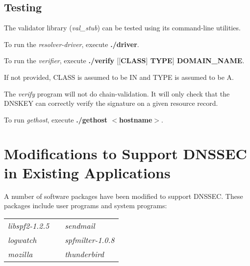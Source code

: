 \documentclass[12pt]{article}
\newcommand{\cmd}[1]{{\em #1}}
\newcommand{\lib}[1]{{\em #1}}
\newcommand{\xqt}[1]{{\bf #1}}
\begin{document}

\subsection{Testing}

The validator library (\lib{val\_stub}) can be tested using its command-line
utilities.

To run the \cmd{resolver-driver}, execute \xqt{./driver}.

To run the \cmd{verifier}, execute \xqt{./verify $[[$CLASS$]$ TYPE$]$ DOMAIN\_NAME}.

If not provided, CLASS is assumed to be IN and TYPE is assumed to be A.

The \cmd{verify} program will not do chain-validation.  It will only check
that the DNSKEY can correctly verify the signature on a given resource record.

To run \cmd{gethost}, execute \xqt{./gethost $<$hostname$>$}.


\clearpage

\section{Modifications to Support DNSSEC in Existing Applications}
\label{modifications}

A number of software packages have been modified to support DNSSEC.  These
packages include user programs and system programs:

\begin{table}[hb]
\begin{center}
\begin{tabular}{lll}
\lib{libspf2-1.2.5}	& \hspace{1in} & \cmd{sendmail}		\\
\cmd{logwatch}		& \hspace{1in} & \cmd{spfmilter-1.0.8}	\\
\cmd{mozilla}		& \hspace{1in} & \cmd{thunderbird}	\\
\end{tabular}
\end{center}
\end{table}
\end{document}
